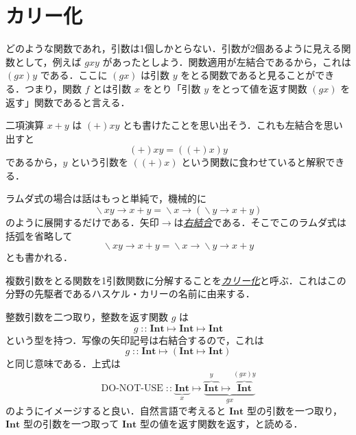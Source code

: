 \documentclass[a4paper,draft]{jsbook}
\newcommand{\keyword}[1]{{\underline{\emph{#1}}}}
\newcommand{\mVar}[1]{\text{DO-NOT-USE}}
\newcommand{\mType}[1]{\mathbf{#1}}
\newcommand{\mIntType}{\mType{Int}}
\DeclareMathOperator{\mLambda}{\backslash}
\DeclareMathOperator{\mLambdaArrow}{\rightarrow}
\DeclareMathOperator{\mIn}{{:\!:}}
\DeclareMathOperator{\mMapsTo}{\mapsto}
\newcommand{\mLambdaExp}[2]{\mLambda{#1}\mLambdaArrow{#2}}
\newcommand{\mProjection}[2]{#1\mMapsTo#2}
\begin{document}
\section{カリー化}

どのような関数であれ，引数は1個しかとらない．引数が2個あるように見える関数として，例えば $gxy$ があったとしよう．関数適用が左結合であるから，これは $\left(gx\right)y$ である．ここに $\left(gx\right)$ は引数 $y$ をとる関数であると見ることができる．つまり，関数 $f$ とは引数 $x$ をとり「引数 $y$ をとって値を返す関数 $\left(gx\right)$ を返す」関数であると言える．

二項演算 $x+y$ は $(+)xy$ とも書けたことを思い出そう．これも左結合を思い出すと
\begin{equation}
(+)xy=\left((+)x\right)y
\end{equation}
であるから，$y$ という引数を $\left((+)x\right)$ という関数に食わせていると解釈できる．

ラムダ式の場合は話はもっと単純で，機械的に
\begin{equation}
\mLambdaExp{xy}{x+y}
=\mLambdaExp{x}{\left(\mLambdaExp{y}{x+y}\right)}
\end{equation}
のように展開するだけである．矢印$\mLambdaArrow$は\keyword{右結合}である．そこでこのラムダ式は括弧を省略して
\begin{equation}
\mLambdaExp{xy}{x+y}
=\mLambdaExp{x}{\mLambdaExp{y}{x+y}}
\end{equation}
とも書かれる．

複数引数をとる関数を1引数関数に分解することを\keyword{カリー化}と呼ぶ．これはこの分野の先駆者であるハスケル・カリーの名前に由来する．


整数引数を二つ取り，整数を返す関数 $g$ は
\begin{equation}
g\mIn\mProjection{\mIntType}{\mProjection{\mIntType}{\mIntType}}
\end{equation}
という型を持つ．写像の矢印記号は右結合するので，これは
\begin{equation}
g\mIn\mProjection{\mIntType}{\left(\mProjection{\mIntType}{\mIntType}\right)}
\end{equation}
と同じ意味である．上式は
\begin{equation*}
\mVar{g}\mIn
\underbrace{\mIntType}_x
\mMapsTo
\underbrace{\overbrace{\mIntType}^y
\mMapsTo\overbrace{\mIntType}^{(gx)y}}_{gx}
\end{equation*}
のようにイメージすると良い．自然言語で考えると $\mIntType$ 型の引数を一つ取り，$\mIntType$ 型の引数を一つ取って $\mIntType$ 型の値を返す関数を返す，と読める．
\end{document}
